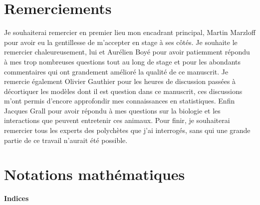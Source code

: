 \documentclass[12pt,]{article}
\begin{document}
\restoregeometry

\cleardoublepage 
{}



\hypertarget{remerciements}{%
\section{Remerciements}\label{remerciements}}

Je souhaiterai remercier en premier lieu mon encadrant principal, Martin
Marzloff pour avoir eu la gentillesse de m'accepter en stage à ses
côtés. Je souhaite le remercier chaleureusement, lui et Aurélien Boyé
pour avoir patiemment répondu à mes trop nombreuses questions tout au
long de stage et pour les abondants commentaires qui ont grandement
amélioré la qualité de ce manuscrit. Je remercie également Olivier
Gauthier pour les heures de discussion passées à décortiquer les modèles
dont il est question dans ce manuscrit, ces discussions m'ont permis
d'encore approfondir mes connaissances en statistiques. Enfin Jacques
Grall pour avoir répondu à mes questions sur la biologie et les
interactions que peuvent entretenir ces animaux. Pour finir, je
souhaiterai remercier tous les experts des polychètes que j'ai
interrogés, sans qui une grande partie de ce travail n'aurait été
possible.

\hypertarget{notations-mathuxe9matiques}{%
\section{Notations mathématiques}\label{notations-mathuxe9matiques}}

\textbf{Indices}
\end{document}
